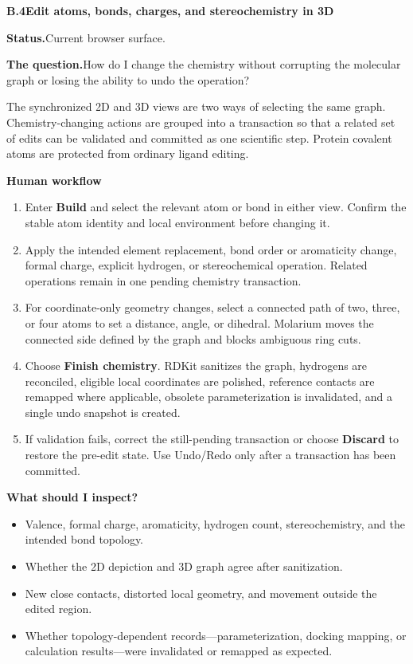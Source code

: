 \documentclass[10pt,letterpaper]{article}
\newcommand{\lead}[1]{\textbf{#1}\hspace{0.35em}}
\newcommand{\subhead}[1]{%
  \par\needspace{2\baselineskip}\vspace{2.5pt}%
  {\fontsize{10.91}{13.1}\selectfont\bfseries #1}\par\vspace{-1.5pt}}
\newcommand{\workflowsection}[4]{%
  \par\needspace{5\baselineskip}\vspace{7.5pt}%
  {\fontsize{10.91}{13.1}\selectfont\bfseries #1\hspace{1.1em}#2}\par\vspace{2pt}%
  \lead{Status.}#3.\par\vspace{-3.5pt}%
  \lead{The question.}#4\par}
\begin{document}
\workflowsection{B.4}{Edit atoms, bonds, charges, and stereochemistry in 3D}{Current browser surface}{How do I change the chemistry without corrupting the molecular graph or losing the ability to undo the operation?}

The synchronized 2D and 3D views are two ways of selecting the same graph. Chemistry-changing actions are grouped into a transaction so that a related set of edits can be validated and committed as one scientific step. Protein covalent atoms are protected from ordinary ligand editing.

\subhead{Human workflow}

\begin{enumerate}
\item Enter \textbf{Build} and select the relevant atom or bond in either view. Confirm the stable atom identity and local environment before changing it.
\item Apply the intended element replacement, bond order or aromaticity change, formal charge, explicit hydrogen, or stereochemical operation. Related operations remain in one pending chemistry transaction.
\item For coordinate-only geometry changes, select a connected path of two, three, or four atoms to set a distance, angle, or dihedral. Molarium moves the connected side defined by the graph and blocks ambiguous ring cuts.
\item Choose \textbf{Finish chemistry}. RDKit sanitizes the graph, hydrogens are reconciled, eligible local coordinates are polished, reference contacts are remapped where applicable, obsolete parameterization is invalidated, and a single undo snapshot is created.
\item If validation fails, correct the still-pending transaction or choose \textbf{Discard} to restore the pre-edit state. Use Undo/Redo only after a transaction has been committed.
\end{enumerate}

\subhead{What should I inspect?}

\begin{itemize}
\item Valence, formal charge, aromaticity, hydrogen count, stereochemistry, and the intended bond topology.
\item Whether the 2D depiction and 3D graph agree after sanitization.
\item New close contacts, distorted local geometry, and movement outside the edited region.
\item Whether topology-dependent records---parameterization, docking mapping, or calculation results---were invalidated or remapped as expected.
\end{itemize}
\end{document}
